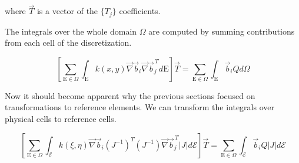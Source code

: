 \documentclass[11pt]{style/memo}
\begin{document}
where $\vec{T}$ is a vector of the $\{T_j\}$ coefficients.

The integrals over the whole domain $\Omega$ are computed by summing contributions from each
cell of the discretization.

\begin{equation*}
    \left[ \sum_{\mathrm{E}\in\Omega}\int_\mathrm{E} k(x,y) \vec{\nabla}\vec{b}_i \vec{\nabla}\vec{b}_j^{\,T} d\mathrm{E} \right] \vec{T} = \sum_{\mathrm{E}\in\Omega}\int_\mathrm{E} \vec{b}_i Q d\Omega
\end{equation*}

Now it should become apparent why the previous sections focused on transformations to reference
elements. We can transform the integrals over physical cells to reference cells.

\begin{equation*}
    \left[ \sum_{\mathrm{E}\in\Omega}\int_\mathcal{E} k(\xi,\eta) \vec{\nabla}\vec{b}_i (J^{-1})^T(J^{-1}) \vec{\nabla}\vec{b}_j^{\,T} \left\lvert J \right\rvert d\mathcal{E} \right] \vec{T} = \sum_{\mathrm{E}\in\Omega}\int_\mathcal{E} \vec{b}_i Q \left\lvert J \right\rvert d\mathcal{E}
\end{equation*}

\nocite{segerlind-1984, zienkiewicz-2005, guermond-2000, buluc-2011}


\end{document}
